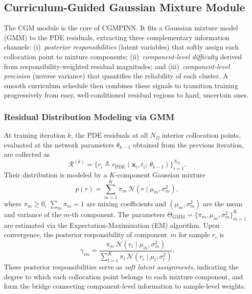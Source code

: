 \documentclass{article}
\theoremstyle{plain}
\theoremstyle{definition}
\theoremstyle{remark}
\begin{document}
	\subsection{Curriculum-Guided Gaussian Mixture Module}
	
	The CGM module is the core of CGMPINN. It fits a Gaussian mixture model
	(GMM) to the PDE residuals, extracting three complementary information
	channels: (i)~\emph{posterior responsibilities} (latent variables) that
	softly assign each collocation point to mixture components;
	(ii)~\emph{component-level difficulty} derived from
	responsibility-weighted residual magnitudes;
	and (iii)~\emph{component-level precision} (inverse variance)
	that quantifies the reliability of each cluster.
	A smooth curriculum schedule then combines these signals to
	transition training progressively from easy, well-conditioned residual
	regions to hard, uncertain ones.
	
	\subsubsection{Residual Distribution Modeling via GMM}
	
	At training iteration $k$, the PDE residuals at all $N_\Omega$ interior
	collocation points, evaluated at the network parameters
	$\theta_{k-1}$ obtained from the previous iteration, are collected as
	\begin{equation}
		\mathcal{R}^{(k)}
		= \bigl\{r_i \triangleq
		r_{\mathrm{PDE}}(\boldsymbol{x}_i,t_i;\,\theta_{k-1})
		\bigr\}_{i=1}^{N_\Omega}.
		\label{eq:residual_set}
	\end{equation}
	Their distribution is modeled by a $K$-component Gaussian mixture
	\begin{equation}
		p(r) = \sum_{m=1}^{K}\pi_m\,
		\mathcal{N}(r\mid\mu_m,\sigma_m^2),
		\label{eq:gmm_pdf}
	\end{equation}
	where $\pi_m\!\geqslant\!0$, $\sum_m\pi_m\!=\!1$ are mixing coefficients and
	$(\mu_m,\sigma_m^2)$ are the mean and variance of the $m$-th component.
	The parameters
	$\Theta_{\mathrm{GMM}}=\{\pi_m,\mu_m,\sigma_m^2\}_{m=1}^{K}$
	are estimated via the Expectation-Maximization (EM) algorithm.
	Upon convergence, the posterior responsibility of component~$m$
	for sample $r_i$ is
	\begin{equation}
		\gamma_{im}
		= \frac{\pi_m\,\mathcal{N}(r_i\mid\mu_m,\sigma_m^2)}
		{\sum_{l=1}^{K}\pi_l\,
			\mathcal{N}(r_i\mid\mu_l,\sigma_l^2)}.
		\label{eq:gmm_posterior}
	\end{equation}
	These posterior responsibilities serve as \emph{soft latent assignments},
	indicating the degree to which each collocation point belongs to each
	mixture component, and form the bridge connecting component-level
	information to sample-level weights.
	
\end{document}
